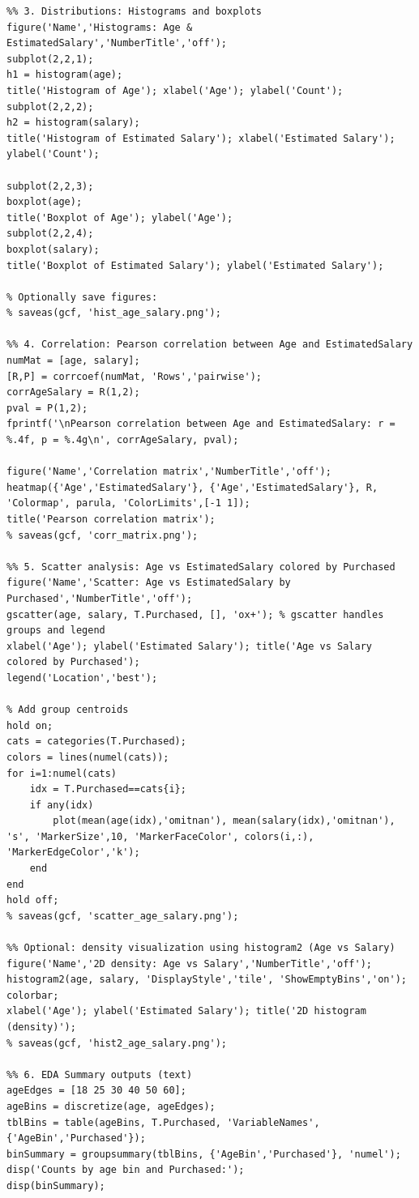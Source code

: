 \documentclass[11pt,a4paper]{article}
\begin{document}
\begin{verbatim}
%% 3. Distributions: Histograms and boxplots
figure('Name','Histograms: Age & EstimatedSalary','NumberTitle','off');
subplot(2,2,1);
h1 = histogram(age);
title('Histogram of Age'); xlabel('Age'); ylabel('Count');
subplot(2,2,2);
h2 = histogram(salary);
title('Histogram of Estimated Salary'); xlabel('Estimated Salary'); ylabel('Count');

subplot(2,2,3);
boxplot(age);
title('Boxplot of Age'); ylabel('Age');
subplot(2,2,4);
boxplot(salary);
title('Boxplot of Estimated Salary'); ylabel('Estimated Salary');

% Optionally save figures:
% saveas(gcf, 'hist_age_salary.png');

%% 4. Correlation: Pearson correlation between Age and EstimatedSalary
numMat = [age, salary];
[R,P] = corrcoef(numMat, 'Rows','pairwise');
corrAgeSalary = R(1,2);
pval = P(1,2);
fprintf('\nPearson correlation between Age and EstimatedSalary: r = %.4f, p = %.4g\n', corrAgeSalary, pval);

figure('Name','Correlation matrix','NumberTitle','off');
heatmap({'Age','EstimatedSalary'}, {'Age','EstimatedSalary'}, R, 'Colormap', parula, 'ColorLimits',[-1 1]);
title('Pearson correlation matrix');
% saveas(gcf, 'corr_matrix.png');

%% 5. Scatter analysis: Age vs EstimatedSalary colored by Purchased
figure('Name','Scatter: Age vs EstimatedSalary by Purchased','NumberTitle','off');
gscatter(age, salary, T.Purchased, [], 'ox+'); % gscatter handles groups and legend
xlabel('Age'); ylabel('Estimated Salary'); title('Age vs Salary colored by Purchased');
legend('Location','best');

% Add group centroids
hold on;
cats = categories(T.Purchased);
colors = lines(numel(cats));
for i=1:numel(cats)
    idx = T.Purchased==cats{i};
    if any(idx)
        plot(mean(age(idx),'omitnan'), mean(salary(idx),'omitnan'), 's', 'MarkerSize',10, 'MarkerFaceColor', colors(i,:), 'MarkerEdgeColor','k');
    end
end
hold off;
% saveas(gcf, 'scatter_age_salary.png');

%% Optional: density visualization using histogram2 (Age vs Salary)
figure('Name','2D density: Age vs Salary','NumberTitle','off');
histogram2(age, salary, 'DisplayStyle','tile', 'ShowEmptyBins','on');
colorbar;
xlabel('Age'); ylabel('Estimated Salary'); title('2D histogram (density)');
% saveas(gcf, 'hist2_age_salary.png');

%% 6. EDA Summary outputs (text)
ageEdges = [18 25 30 40 50 60];
ageBins = discretize(age, ageEdges);
tblBins = table(ageBins, T.Purchased, 'VariableNames', {'AgeBin','Purchased'});
binSummary = groupsummary(tblBins, {'AgeBin','Purchased'}, 'numel');
disp('Counts by age bin and Purchased:');
disp(binSummary);


\end{verbatim}
\end{document}
